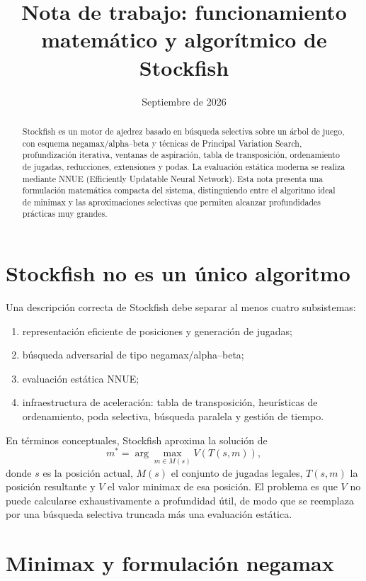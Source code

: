 \documentclass[11pt,a4paper]{article}
\title{Nota de trabajo: funcionamiento matemático y algorítmico de Stockfish}
\author{}
\date{Septiembre de 2026}
\begin{document}
\maketitle

\begin{abstract}
Stockfish es un motor de ajedrez basado en búsqueda selectiva sobre un árbol de juego, con esquema negamax/alpha--beta y técnicas de Principal Variation Search, profundización iterativa, ventanas de aspiración, tabla de transposición, ordenamiento de jugadas, reducciones, extensiones y podas. La evaluación estática moderna se realiza mediante NNUE (Efficiently Updatable Neural Network). Esta nota presenta una formulación matemática compacta del sistema, distinguiendo entre el algoritmo ideal de minimax y las aproximaciones selectivas que permiten alcanzar profundidades prácticas muy grandes.
\end{abstract}

\section{Stockfish no es un único algoritmo}

Una descripción correcta de Stockfish debe separar al menos cuatro subsistemas:
\begin{enumerate}[label=\arabic*.]
    \item representación eficiente de posiciones y generación de jugadas;
    \item búsqueda adversarial de tipo negamax/alpha--beta;
    \item evaluación estática NNUE;
    \item infraestructura de aceleración: tabla de transposición, heurísticas de ordenamiento, poda selectiva, búsqueda paralela y gestión de tiempo.
\end{enumerate}

En términos conceptuales, Stockfish aproxima la solución de
\[
    m^* = \arg\max_{m\in M(s)} V(T(s,m)),
\]
donde $s$ es la posición actual, $M(s)$ el conjunto de jugadas legales, $T(s,m)$ la posición resultante y $V$ el valor minimax de esa posición. El problema es que $V$ no puede calcularse exhaustivamente a profundidad útil, de modo que se reemplaza por una búsqueda selectiva truncada más una evaluación estática.

\section{Minimax y formulación negamax}
\end{document}

